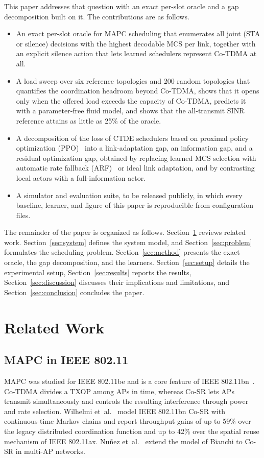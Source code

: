 \documentclass{ieeeaccess}
\begin{document}
This paper addresses that question with an exact per-slot oracle and a gap decomposition built on it. The contributions are as follows.
\begin{itemize}
\item An exact per-slot oracle for MAPC scheduling that enumerates all joint (STA or silence) decisions with the highest decodable MCS per link, together with an explicit silence action that lets learned schedulers represent Co-TDMA at all.
\item A load sweep over six reference topologies and 200 random topologies that quantifies the coordination headroom beyond Co-TDMA, shows that it opens only when the offered load exceeds the capacity of Co-TDMA, predicts it with a parameter-free fluid model, and shows that the all-transmit SINR reference attains as little as 25\% of the oracle.
\item A decomposition of the loss of CTDE schedulers based on proximal policy optimization (PPO)~\cite{schulman2017ppo,yu2022mappo} into a link-adaptation gap, an information gap, and a residual optimization gap, obtained by replacing learned MCS selection with automatic rate fallback (ARF)~\cite{kamerman1997arf} or ideal link adaptation, and by contrasting local actors with a full-information actor.
\item A simulator and evaluation suite, to be released publicly, in which every baseline, learner, and figure of this paper is reproducible from configuration files.
\end{itemize}

The remainder of the paper is organized as follows. Section~\ref{sec:related} reviews related work. Section~\ref{sec:system} defines the system model, and Section~\ref{sec:problem} formulates the scheduling problem. Section~\ref{sec:method} presents the exact oracle, the gap decomposition, and the learners. Section~\ref{sec:setup} details the experimental setup, Section~\ref{sec:results} reports the results, Section~\ref{sec:discussion} discusses their implications and limitations, and Section~\ref{sec:conclusion} concludes the paper.

\section{Related Work}
\label{sec:related}
\subsection{MAPC in IEEE 802.11}
MAPC was studied for IEEE 802.11be and is a core feature of IEEE 802.11bn~\cite{lopez2019ieee,galati2024wifi8}. Co-TDMA divides a TXOP among APs in time, whereas Co-SR lets APs transmit simultaneously and controls the resulting interference through power and rate selection. Wilhelmi et~al.~\cite{wilhelmi2023csr} model IEEE 802.11bn Co-SR with continuous-time Markov chains and report throughput gains of up to 59\% over the legacy distributed coordination function and up to 42\% over the spatial reuse mechanism of IEEE 802.11ax. Nu\~{n}ez et~al.~\cite{nunez2024csr} extend the model of Bianchi to Co-SR in multi-AP networks.
\end{document}
